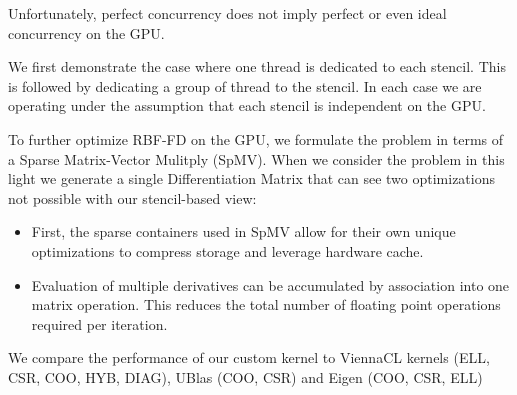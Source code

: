 \documentclass{report}
\begin{document}
Unfortunately, perfect concurrency does not imply perfect or even ideal concurrency on the GPU. 

We first demonstrate the case where one thread is dedicated to each stencil. This is followed by dedicating a group of thread to the stencil. In each case we are operating under the assumption that each stencil is independent on the GPU. 

To further optimize RBF-FD on the GPU, we formulate the problem in terms of a Sparse Matrix-Vector Mulitply (SpMV). When we consider the problem in this light we generate a single Differentiation Matrix that can see two optimizations not possible with our stencil-based view: 
\begin{itemize} 
\item First, the sparse containers used in SpMV allow for their own unique optimizations to compress storage and leverage hardware cache.
\item Evaluation of multiple derivatives can be accumulated by association into one matrix operation. This reduces the total number of floating point operations required per iteration. 
\end{itemize}



We compare the performance of our custom kernel to ViennaCL kernels (ELL, CSR, COO, HYB, DIAG), UBlas (COO, CSR) and Eigen (COO, CSR, ELL)
%
%
\end{document}
